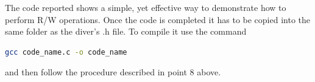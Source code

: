 \vspace{0.1cm}
The code reported shows a simple, yet effective way to demonstrate how to perform R/W operations. Once the code is completed it has to be copied into the same folder as the diver's .h file. To compile it use the command
\vspace{0.1cm}
\begin{lstlisting}[language=bash]
	gcc code_name.c -o code_name	\end{lstlisting}
\vspace{0.1cm}
and then follow the procedure described in point 8 above.